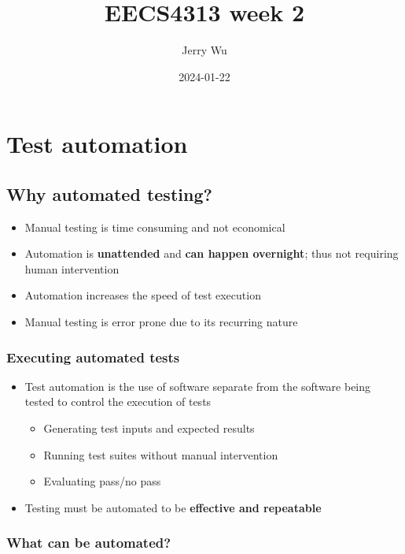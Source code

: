 \documentclass[12pt]{book}
\title{EECS4313 week 2}
\author{Jerry Wu}
\date{2024-01-22}
\begin{document}
\maketitle
\tableofcontents

\chapter{Test automation}

\section*{Why automated testing?}

\begin{itemize}
    \item Manual testing is time consuming and not economical
    \item Automation is \textbf{unattended} and \textbf{can happen overnight}; thus not requiring human intervention
    \item Automation increases the speed of test execution
    \item Manual testing is error prone due to its recurring nature
\end{itemize}

\subsection*{Executing automated tests}

\begin{itemize}
    \item Test automation is the use of software separate from the software being tested to control the execution of tests
    \begin{itemize}
        \item Generating test inputs and expected results
        \item Running test suites without manual intervention
        \item Evaluating pass/no pass
    \end{itemize}

    \item Testing must be automated to be \textbf{effective and repeatable}
\end{itemize}


\subsection*{What can be automated?}
\end{document}
